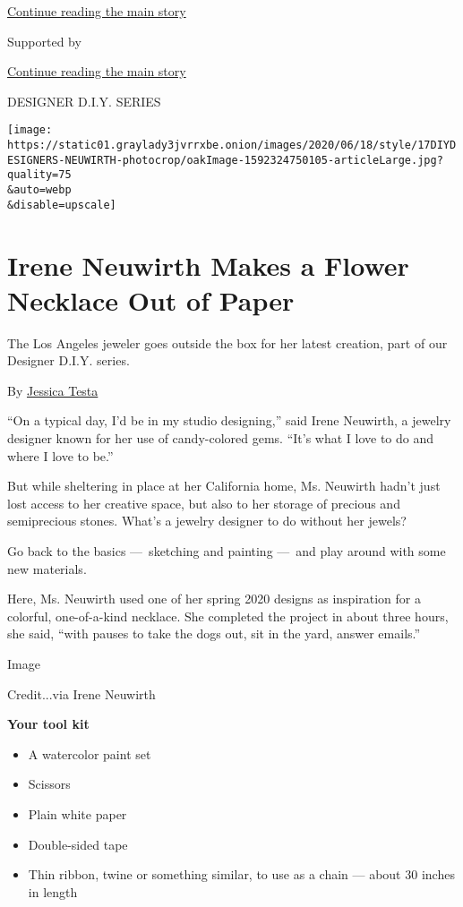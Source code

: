 \protect\hyperlink{after-top}{Continue reading the main story}

Supported by

\protect\hyperlink{after-sponsor}{Continue reading the main story}

DESIGNER D.I.Y. SERIES

\texttt{[image: https://static01.graylady3jvrrxbe.onion/images/2020/06/18/style/17DIYDESIGNERS-NEUWIRTH-photocrop/oakImage-1592324750105-articleLarge.jpg?quality=75\\\&auto=webp\\\&disable=upscale]}

\hypertarget{irene-neuwirth-makes-a-flower-necklace-out-of-paper}{%
\section{Irene Neuwirth Makes a Flower Necklace Out of
Paper}\label{irene-neuwirth-makes-a-flower-necklace-out-of-paper}}

The Los Angeles jeweler goes outside the box for her latest creation,
part of our Designer D.I.Y. series.

By \href{https://www.nytimes3xbfgragh.onion/by/jessica-testa}{Jessica
Testa}

``On a typical day, I'd be in my studio designing,'' said Irene
Neuwirth, a jewelry designer known for her use of candy-colored gems.
``It's what I love to do and where I love to be.''

But while sheltering in place at her California home, Ms. Neuwirth
hadn't just lost access to her creative space, but also to her storage
of precious and semiprecious stones. What's a jewelry designer to do
without her jewels?

Go back to the basics ---~sketching and painting ---~and play around
with some new materials.

Here, Ms. Neuwirth used one of her spring 2020 designs as inspiration
for a colorful, one-of-a-kind necklace. She completed the project in
about three hours, she said, ``with pauses to take the dogs out, sit in
the yard, answer emails.''

Image

Credit...via Irene Neuwirth

\textbf{Your tool kit}

\begin{itemize}
\item
  A watercolor paint set
\item
  Scissors
\item
  Plain white paper
\item
  Double-sided tape
\item
  Thin ribbon, twine or something similar, to use as a chain --- about
  30 inches in length
\end{itemize}

